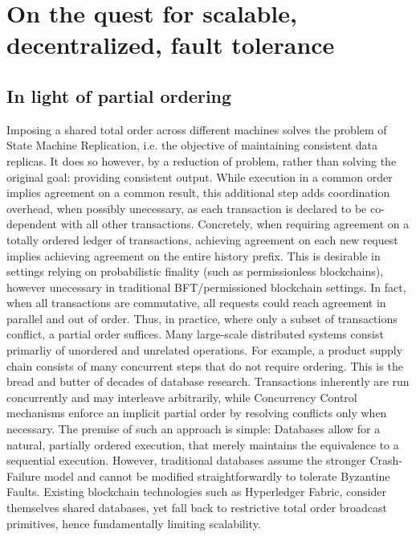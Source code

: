 \section{On the quest for scalable, decentralized, fault tolerance}


\subsection{In light of partial ordering}
\iffalse
Notes:
Talk more about total order. 
And how we really would like to enforce it when necessary only.
How we abstractly treat it as seperate registers on which we can run independent consensus

Databases do it right: They do a partial order and only show the equivalence. 
Hyperledger is a database in its on way: Exec, order, validate architecture. Uses CF consensus however - could be swapped out.\\
\fi


Imposing a shared total order across different machines solves the problem of State Machine Replication, i.e. the objective of maintaining consistent data replicas. It does so however, by a reduction of problem, rather than solving the original goal: providing consistent output. While execution in a common order implies agreement on a common result, this additional step adds coordination overhead, when possibly unecessary, as each transaction is declared to be co-dependent with all other transactions. 
Concretely, when requiring agreement on a totally ordered ledger of transactions, achieving agreement on each new request implies achieving agreement on the entire history prefix. This is desirable in settings relying on probabilistic finality (such as permissionless blockchains), however unecessary in traditional BFT/permissioned blockchain settings. In fact, when all transactions are commutative, all requests could reach agreement in parallel and out of order. Thus, in practice, where only a subset of transactions conflict, a partial order suffices. 
Many large-scale distributed systems consist primarliy of unordered and unrelated operations. For example, a product supply chain consists of many concurrent steps that do not require ordering.
This is the bread and butter of decades of database research. Transactions inherently are run concurrently and may interleave arbitrarily, while Concurrency Control mechanisms enforce an implicit partial order by resolving conflicts only when necessary. The premise of such an approach is simple: Databases allow for a natural, partially ordered execution, that merely maintains the equivalence to a sequential execution.
However, traditional databases assume the stronger Crash-Failure model and cannot be modified straightforwardly to tolerate Byzantine Faults. Existing blockchain technologies such as Hyperledger Fabric, consider themselves shared databases, yet fall back to restrictive total order broadcast primitives, hence fundamentally limiting scalability. 


